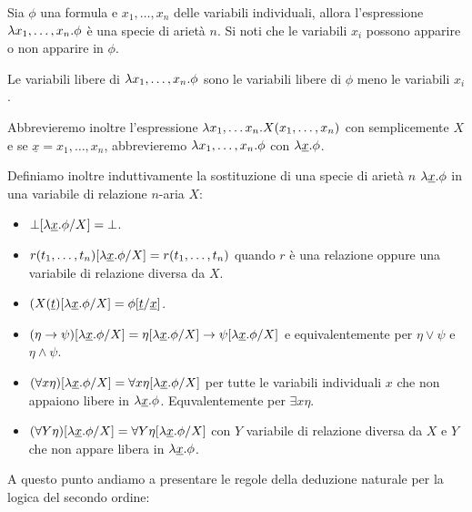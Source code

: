 \documentclass[]{marticle}
\begin{document}
\begin{block}[Definizione]
    Sia $\phi$ una formula e $x_1, \dots, x_n$ delle variabili individuali,
    allora l'espressione $\lambda x_1, \dots, x_n.\phi$ \`e una specie di ariet\`a
    $n$. Si noti che le variabili $x_i$ possono apparire o non apparire in
    $\phi$. 

    Le variabili libere di $\lambda x_1, \dots, x_n.\phi$ sono le variabili libere di
    $\phi$ meno le variabili $x_i$.

    Abbrevieremo inoltre l'espressione $\lambda x_1, \dots x_n.X(x_1, \dots, x_n)$
    con semplicemente $X$ e se $\underline{x}=x_1,\dots, x_n$, abbrevieremo $\lambda
    x_1, \dots, x_n.\phi$ con $\lambda\underline{x}.\phi$.

    Definiamo inoltre induttivamente la sostituzione di una specie di ariet\`a
    $n$ $\lambda\underline{x}.\phi$ in una variabile di relazione $n$-aria $X$:
    \begin{itemize}
        \item $\bot[\lambda\underline{x}.\phi/X] = \bot$.
        \item $r(t_1, \dots, t_n)[\lambda\underline{x}.\phi/X] = r(t_1, \dots,
            t_n)$ quando $r$ \`e una relazione oppure una variabile di relazione
            diversa da $X$.
        \item $(X(\underline{t})[\lambda\underline{x}.\phi/X] =
            \phi[\underline{t}/\underline{x}]$.
        \item $(\eta\rightarrow\psi)[\lambda\underline{x}.\phi/X] =
            \eta[\lambda\underline{x}.\phi/X] \rightarrow
            \psi[\lambda\underline{x}.\phi/X]$
            e equivalentemente per $\eta\lor\psi$ e $\eta\land\psi$.
        \item $(\forall x \eta)[\lambda\underline{x}.\phi/X] = \forall x
            \eta[\lambda\underline{x}.\phi/X]$ per tutte le variabili
            individuali $x$ che non appaiono libere in $\lambda\underline{x}.\phi$.
            Equvalentemente per $\exists x \eta$.
        \item $(\forall Y \eta)[\lambda\underline{x}.\phi/X] = \forall Y
            \eta[\lambda\underline{x}.\phi/X]$ con $Y$ variabile di relazione
            diversa da $X$ e $Y$ che non appare libera in
            $\lambda\underline{x}.\phi$.
    \end{itemize}
\end{block}

A questo punto andiamo a presentare le regole della deduzione naturale per la
logica del secondo ordine:
\end{document}
